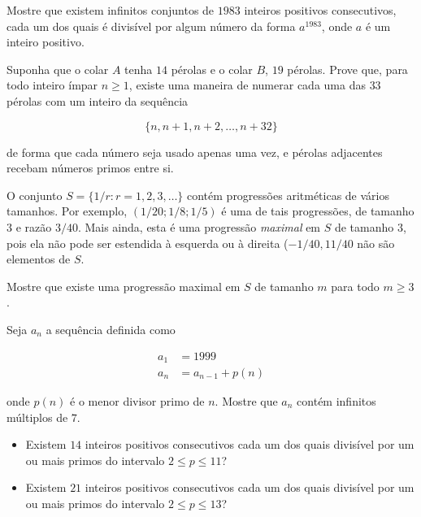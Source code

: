 \begin{questao}
  Mostre que existem infinitos conjuntos de $1983$
  inteiros positivos consecutivos, cada um dos quais é divisível por
  algum número da forma $a^{1983}$, onde $a$ é um inteiro
  positivo.
\end{questao}

\begin{questao}
  Suponha que o colar $A$ tenha $14$ pérolas e o colar
  $B$, $19$ pérolas. Prove que, para todo inteiro ímpar $n \geq
  1$, existe uma maneira de numerar cada uma das $33$ pérolas com
  um inteiro da sequência

  $$ \{n,n+1,n+2,\ldots,n+32 \} $$

  de forma que cada número seja usado apenas uma vez, e pérolas
  adjacentes recebam números primos entre si.
\end{questao}

\begin{questao}
  O conjunto $S = \{1/r: r=1,2,3,\ldots\}$ contém progressões
  aritméticas de vários tamanhos. Por exemplo, $(1/20; 1/8; 1/5)$ é
  uma de tais progressões, de tamanho $3$ e razão $3/40$. Mais
  ainda, esta é uma progressão {\it maximal} em $S$ de tamanho
  $3$, pois ela não pode ser estendida à esquerda ou à direita
  ($-1/40,11/40$ não são elementos de $S$.

  Mostre que existe uma progressão maximal em $S$ de tamanho $m$
  para todo $m \geq 3$.
\end{questao}

\begin{questao}
  Seja $a_n$ a sequência definida como

  \begin{align*}
    a_1 & = 1999 \\
    a_n & = a_{n-1}+p(n)
  \end{align*}

  onde $p(n)$ é o menor divisor primo de $n$. Mostre que $a_n$
  contém infinitos múltiplos de $7$.  
\end{questao}

\begin{questao}
  \begin{itemize}
    \item Existem $14$ inteiros positivos consecutivos cada um dos
    quais divisível por um ou mais primos do intervalo $2 \leq p \leq
    11$?

    \item Existem $21$ inteiros positivos consecutivos cada um dos
    quais divisível por um ou mais primos do intervalo $2 \leq p \leq
    13$?
  \end{itemize}

\end{questao}

